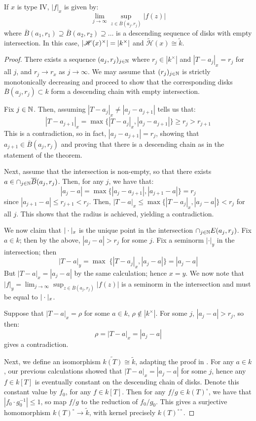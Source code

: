 \begin{prop}\label{prop:type4}
    If $x$ is type IV, $|f|_x$ is given by: \[\lim_{j \to \infty} \sup_{z \in \overline{B}(a_j, r_j)}|f(z)|\] where $\overline{B}(a_1, r_1) \supseteq \overline{B}(a_2, r_2) \supseteq \dots$ is a descending sequence of disks with empty intersection. In this case, $|\mathscr{H}(x)^\times| = |k^\times|$ and $\tilde{\mathscr{H}}(x) \cong \tilde{k}$.
\end{prop}
\begin{proof}
There exists a sequence $(a_j, r_j)_{j \in \mathbb{N}}$ where $r_j \in |k^{\times}|$ and $|T - a_j|_x = r_j$ for all $j$, and $r_j \to r_x$ as $j \to \infty$. 
We may assume that $(r_j)_{j \in \mathbb{N}}$ is strictly monotonically decreasing and proceed to show that the corresponding disks $\overline{B}(a_j, r_j) \subset k$ form a descending chain with empty intersection. 

Fix $j \in \mathbb{N}$. Then, assuming $|T-a_j|_x \neq |a_j - a_{j + 1}|$ tells us that:
\[
|T - a_{j + 1}|_x = \max\{ |T - a_j|_x, |a_j - a_{j + 1}|\} \geq r_{j} > r_{j + 1}
\]
This is a contradiction, so in fact, $|a_j - a_{j + 1}| = r_j$, showing that $a_{j + 1} \in \overline{B}(a_j, r_j)$ and proving that there is a descending chain as in the statement of the theorem.

Next, assume that the intersection is non-empty, so that there exists $a \in \cap_{j \in \mathbb{N}} \overline{B}(a_j, r_j)$. Then, for any $j$, we have that:
\[
|a_j - a| = \max \{ |a_j - a_{j + 1}|, |a_{j + 1} - a| \} = r_j
\]
since $|a_{j + 1} - a| \leq r_{j + 1} < r_j$. Then, $|T - a|_x \leq  \max\{|T - a_j|_x, |a_j - a|\} < r_j$ for all $j$. This shows that the radius is achieved, yielding a contradiction.

We now claim that $|\cdot|_x$ is the unique point in the intersection $\cap_{j \in \mathbb{N}} E(a_j, r_j)$. Fix $a \in k$; then by the above, $|a_j - a| > r_j$ for some $j$. 
Fix a seminorm ${|\cdot|_y}$ in the intersection; then 
\[
|T - a|_y = \max\; \{|T - a_j|_x, |a_j - a| \} = |a_j - a|
\] 
But $|T - a|_x = |a_j - a|$ by the same calculation; hence $x = y$. 
We now note that $|f|_y = \lim_{j \to \infty} \sup_{z \in \overline{B}(a_j, r_j)} |f(z)|$ is a seminorm in the intersection and must be equal to $|\cdot|_x$.

Suppose that $|T - a|_x = \rho$ for some $a \in k$, $\rho \not\in |k^\times|$. For some $j$, $|a_j - a| > r_j$, so then:
\[\rho = |T - a|_x = |a_j - a|
\]
gives a contradiction.

Next, we define an isomorphism $\widetilde{k(T)} \cong \tilde{k}$, adapting the proof in \parencite[Prop. 2.3]{potdynams}. For any $a \in k$, our previous calculations showed that $|T - a|_x = |a_j - a|$ for some $j$, hence any $f \in k[T]$ is eventually constant on the descending chain of disks. Denote this constant value by $f_0$, for any $f \in k[T]$. Then for any $f/g \in k(T)^{\circ}$, we have that $|f_0\cdot g_0^{-1}| \leq 1$, so map $f/g$ to the reduction of $f_0/g_0$. This gives a surjective homomorphism $k(T)^{\circ} \to \tilde{k}$, with kernel precisely $k(T)^{\circ\circ}$.
\end{proof}

